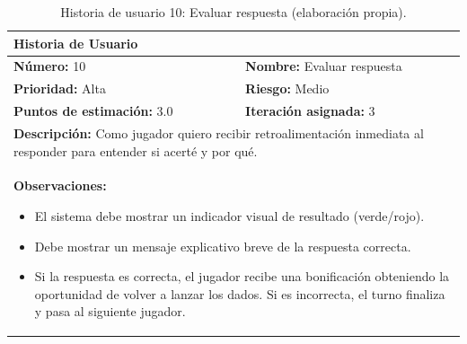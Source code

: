 \begin{table}[H]
\centering
\caption{Historia de usuario 10: Evaluar respuesta (elaboración propia).\label{tab:hu10}}
\renewcommand{\arraystretch}{1.5}
\begin{tabular}{|p{}|p{}|}
\hline
\multicolumn{2}{|l|}{\textbf{Historia de Usuario}} \\
\hline
\textbf{Número:} 10 & \textbf{Nombre:} Evaluar respuesta \\
\hline
\textbf{Prioridad:} Alta & \textbf{Riesgo:} Medio \\
\hline
\textbf{Puntos de estimación:} 3.0 & \textbf{Iteración asignada:} 3 \\
\hline
\multicolumn{2}{|p{0.945\textwidth}|}{\textbf{Descripción:} Como jugador quiero recibir retroalimentación inmediata al responder para entender si acerté y por qué.} \\
\hline
\multicolumn{2}{|p{0.945\textwidth}|}{\textbf{Observaciones:}
\vspace{-0.5em}
\begin{itemize}
    \setlength\itemsep{0em}
    \item El sistema debe mostrar un indicador visual de resultado (verde/rojo).
    \item Debe mostrar un mensaje explicativo breve de la respuesta correcta.
    \item Si la respuesta es correcta, el jugador recibe una bonificación obteniendo la oportunidad de volver a lanzar los dados. Si es incorrecta, el turno finaliza y pasa al siguiente jugador.
\end{itemize}
\vspace{-1em}
} \\
\hline
\end{tabular}
\end{table}

